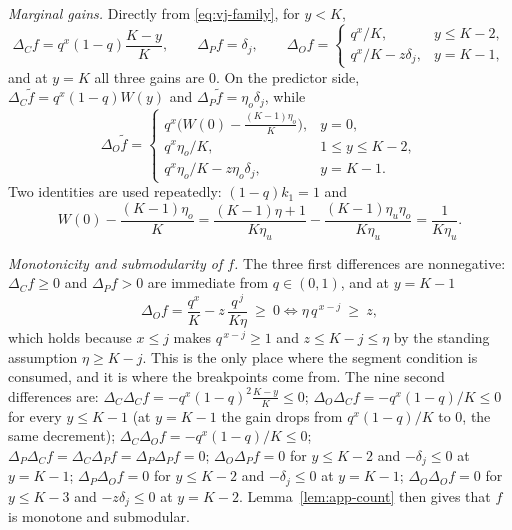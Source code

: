 \emph{Marginal gains.}  Directly from \eqref{eq:vj-family}, for $y<K$,
\[
  \Delta_Cf=q^{x}(1-q)\frac{K-y}{K},\qquad
  \Delta_Pf=\delta_j,\qquad
  \Delta_Of=\begin{cases}q^{x}/K,& y\le K-2,\\
                        q^{x}/K-z\delta_j,& y=K-1,\end{cases}
\]
and at $y=K$ all three gains are $0$.  On the predictor side, $\Delta_C\tilde f=q^{x}(1-q)W(y)$ and
$\Delta_P\tilde f=\eta_o\delta_j$, while
\[
  \Delta_O\tilde f=\begin{cases}
    q^{x}\bigl(W(0)-\tfrac{(K-1)\eta_o}{K}\bigr), & y=0,\\
    q^{x}\eta_o/K, & 1\le y\le K-2,\\
    q^{x}\eta_o/K-z\eta_o\delta_j, & y=K-1 .
  \end{cases}
\]
Two identities are used repeatedly: $(1-q)k_1=1$ and
\begin{equation}\label{eq:W0-identity}
  W(0)-\frac{(K-1)\eta_o}{K}
  =\frac{(K-1)\eta+1}{K\eta_u}-\frac{(K-1)\eta_u\eta_o}{K\eta_u}
  =\frac{1}{K\eta_u}.
\end{equation}

\emph{Monotonicity and submodularity of $f$.}  The three first differences are
nonnegative: $\Delta_Cf\ge0$ and $\Delta_Pf>0$ are immediate from
$q\in(0,1)$, and at $y=K-1$
\[
  \Delta_Of=\frac{q^{x}}{K}-z\,\frac{q^{\,j}}{K\eta}\ \ge\ 0
  \iff \eta\,q^{\,x-j}\ \ge\ z ,
\]
which holds because $x\le j$ makes $q^{\,x-j}\ge1$ and $z\le K-j\le\eta$ by the
standing assumption $\eta\ge K-j$.  This is the only place where the segment
condition is consumed, and it is where the breakpoints come from.  The nine
second differences are:
$\Delta_C\Delta_Cf=-q^{x}(1-q)^{2}\frac{K-y}{K}\le0$;
$\Delta_O\Delta_Cf=-q^{x}(1-q)/K\le0$ for every $y\le K-1$ (at $y=K-1$ the
gain drops from $q^{x}(1-q)/K$ to $0$, the same decrement);
$\Delta_C\Delta_Of=-q^{x}(1-q)/K\le0$;
$\Delta_P\Delta_Cf=\Delta_C\Delta_Pf=\Delta_P\Delta_Pf=0$;
$\Delta_O\Delta_Pf=0$ for $y\le K-2$ and $-\delta_j\le0$ at $y=K-1$;
$\Delta_P\Delta_Of=0$ for $y\le K-2$ and $-\delta_j\le0$ at $y=K-1$;
$\Delta_O\Delta_Of=0$ for $y\le K-3$ and $-z\delta_j\le0$ at $y=K-2$.
Lemma~\ref{lem:app-count} then gives that $f$ is monotone and submodular.

